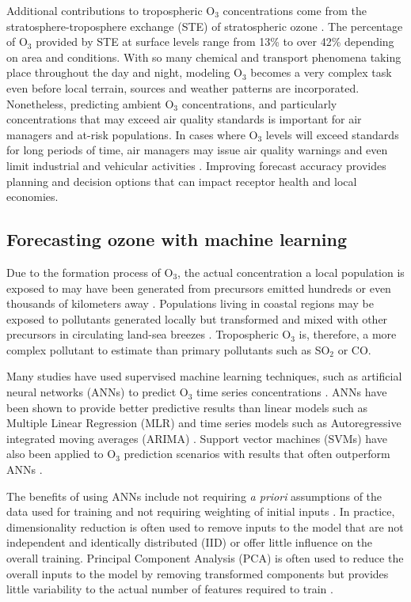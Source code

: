 Additional contributions to tropospheric O$_{3}$ concentrations come from the stratosphere-troposphere exchange (STE) of stratospheric ozone \citep{Tarasick2008}. The percentage of O$_{3}$ provided by STE at surface levels range from 13\% \citep{Cooper2006} to over 42\% \citep{Lelieveld2000} depending on area and conditions. With so many chemical and transport phenomena taking place throughout the day and night, modeling O$_{3}$ becomes a very complex task even before local terrain, sources and weather patterns are incorporated. Nonetheless, predicting ambient O$_{3}$ concentrations, and particularly concentrations that may exceed air quality standards is important for air managers and at-risk populations.  In cases where O$_{3}$ levels will exceed standards for long periods of time, air managers may issue air quality warnings and even limit industrial and vehicular activities \citep{Kuhlbusch2014, Welch2005}. Improving forecast accuracy provides planning and decision options that can impact receptor health and local economies.

\subsection{Forecasting ozone with machine learning}

Due to the formation process of O$_{3}$, the actual concentration a local population is exposed to may have been generated from precursors emitted hundreds or even thousands of kilometers away \citep{Glavas2011}. Populations living in coastal regions may be exposed to pollutants generated locally but transformed and mixed with other precursors in circulating land-sea breezes \citep{Freeman2017a}. Tropospheric O$_{3}$ is, therefore, a more complex pollutant to estimate than primary pollutants such as SO$_{2}$ or CO.

Many studies have used supervised machine learning techniques, such as artificial neural networks (ANNs) to predict O$_{3}$ time series concentrations \citep{Comrie1997, Dorling2003, Ettouney2009a, Kurt2008, Biancofiore2017}. ANNs have been shown to provide better predictive results than linear models such as Multiple Linear Regression (MLR) and time series models such as Autoregressive integrated moving averages (ARIMA) \citep{Gardner1998, Prybutok2000}. Support vector machines (SVMs) have also been applied to O$_{3}$ prediction scenarios with results that often outperform ANNs \citep{Luna2014, Papaleonidas2013, Singh2013}. 

The benefits of using ANNs include not requiring \textit{a priori} assumptions of the data used for training and not requiring weighting of initial inputs \citep{Gardner1998}. In practice, dimensionality reduction is often used to remove inputs to the model that are not independent and identically distributed (IID) or offer little influence on the overall training. Principal Component Analysis (PCA) is often used to reduce the overall inputs to the model by removing transformed components but provides little variability to the actual number of features required to train \citep{Singh2013, Wang2015a}.

